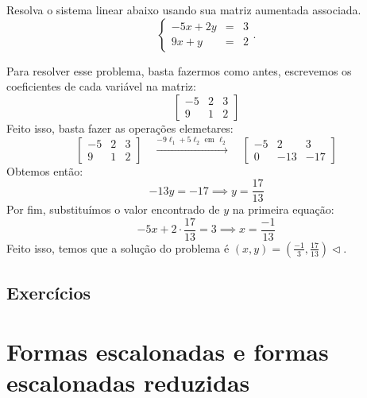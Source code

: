 \begin{exeresol}
Resolva o sistema linear abaixo usando sua matriz aumentada associada.
\begin{equation}
  \left\{
    \begin{array}{rcl}
      -5x+2y&=&3 \\
      9x+y&=&2
    \end{array}
  \right..
\end{equation}
\end{exeresol}
\begin{resol}
Para resolver esse problema, basta fazermos como antes, escrevemos os coeficientes de cada variável na matriz:
\begin{equation}
 \left[
  \begin{array}{cc|c}
    -5 &  2 & 3 \\
    9 & 1 & 2
  \end{array}
\right]
\end{equation}
Feito isso, basta fazer as operações elemetares:
\begin{equation}
 \left[
  \begin{array}{cc|c}
    -5 &  2 & 3 \\
    9 & 1 & 2
  \end{array}
\right]
\quad \xrightarrow{-9\ell_1 + 5\ell_2 \text{ em } \ell_2} \quad
 \left[
  \begin{array}{cc|c}
    -5 &  2 & 3 \\
    0 & -13 & -17
  \end{array}
\right]
\end{equation}
Obtemos então:
\begin{equation}
-13y = -17 \implies y = \frac{17}{13}
\end{equation}
Por fim, substituímos o valor encontrado de $y$ na primeira equação:
\begin{equation}
 -5x + 2\cdot \frac{17}{13} = 3 \implies x = \frac{-1}{13}
\end{equation}
Feito isso, temos que a solução do problema é $(x,y) = (\frac{-1}{3}, \frac{17}{13}) \lhd$.
\end{resol}

\subsection*{Exercícios}

\construirExer

\section{Formas escalonadas e formas escalonadas reduzidas}


